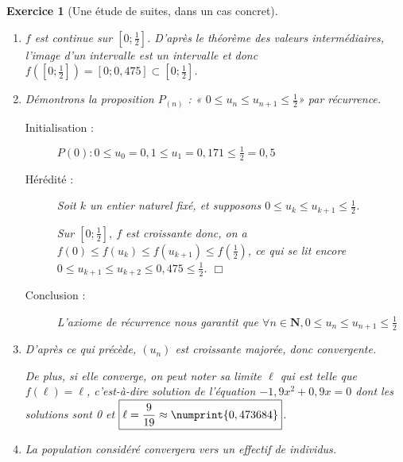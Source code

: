 \documentclass[12pt,a4paper]{article}
\newcommand{\np}{\numprint}
\theoremstyle{break}
\theoremstyle{nobreak}
\newtheorem{exercice}{Exercice}
\theoremstyle{nonumberplain}
\newcommand{\N}{\mathbf{N}}
\newcommand{\R}{\mathbf{R}}
\newcommand{\qed}{\hfill$\Box$}
\begin{document}
\begin{exercice}[Une étude de suites, dans un cas concret]
\begin{enumerate}
\begin{enumerate}
          $\forall x\in \R,\ f'(x) = -3,8x + 1,9$.

        \item $f$ est continue sur $\left[0;\frac12\right]$. D'après le
          théorème des valeurs intermédiaires, l'image d'un intervalle
          est un intervalle et donc
          $f\left(\left[0;\frac12\right]\right) = \left[0;0,475\right]
          \subset \left[0;\frac12\right]$.
        \item Démontrons la proposition $P_(n)$ : « $0 \leqslant u_n
          \leqslant u_{n+1} \leqslant \frac12$» par récurrence.
          \begin{description}
            \item[Initialisation :] $P(0) : 0 \leqslant u_0 = 0,1
              \leqslant u_1 = 0,171 \leqslant \frac12 = 0,5$
            \item[Hérédité :] Soit $k$ un entier naturel fixé, et
              supposons $0 \leqslant u_k \leqslant u_{k+1} \leqslant
              \frac12$.

              Sur $\left[0;\frac12\right],\ f$ est croissante donc, on a
              $f(0) \leqslant f(u_k) \leqslant f(u_{k+1}) \leqslant
              f\left(\frac12\right)$, ce qui se lit encore $0 \leqslant
              u_{k+1} \leqslant u_{k+2} \leqslant 0,475 \leqslant
              \frac12$. \qed
              \item[Conclusion :] L'axiome de récurrence nous garantit
              que $\forall n\in\N, 0 \leqslant u_n \leqslant u_{n+1}
              \leqslant \frac12$
          \end{description}
        \item D'après ce qui précède, $(u_n)$ est croissante majorée,
          donc convergente.

          De plus, si elle converge, on peut noter sa limite $\ell$ qui
          est telle que $f(\ell) = \ell$, c'est-à-dire solution de
          l'équation $-1,9x^2+0,9x = 0$ dont les solutions sont 0 et
          $\boxed{\ell = \frac9{19} \approx \np{0,473684}}$.
        \item La population considéré convergera vers un effectif de
          \np{473684} individus.
      \end{enumerate}
  \end{enumerate}
\end{exercice}
\end{document}
